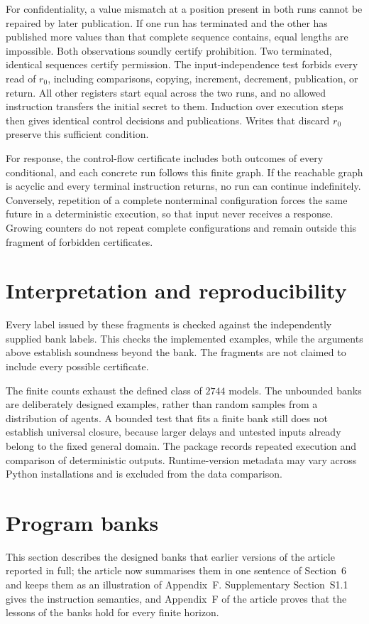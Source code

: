 \documentclass[11pt]{article}
\begin{document}
For confidentiality, a value mismatch at a position present in both runs cannot be repaired by later publication. If one run has terminated and the other has published more values than that complete sequence contains, equal lengths are impossible. Both observations soundly certify prohibition. Two terminated, identical sequences certify permission. The input-independence test forbids every read of $r_0$, including comparisons, copying, increment, decrement, publication, or return. All other registers start equal across the two runs, and no allowed instruction transfers the initial secret to them. Induction over execution steps then gives identical control decisions and publications. Writes that discard $r_0$ preserve this sufficient condition.

For response, the control-flow certificate includes both outcomes of every conditional, and each concrete run follows this finite graph. If the reachable graph is acyclic and every terminal instruction returns, no run can continue indefinitely. Conversely, repetition of a complete nonterminal configuration forces the same future in a deterministic execution, so that input never receives a response. Growing counters do not repeat complete configurations and remain outside this fragment of forbidden certificates.

\section{Interpretation and reproducibility}
Every label issued by these fragments is checked against the independently supplied bank labels. This checks the implemented examples, while the arguments above establish soundness beyond the bank. The fragments are not claimed to include every possible certificate.

The finite counts exhaust the defined class of $2744$ models. The unbounded banks are deliberately designed examples, rather than random samples from a distribution of agents. A bounded test that fits a finite bank still does not establish universal closure, because larger delays and untested inputs already belong to the fixed general domain. The package records repeated execution and comparison of deterministic outputs. Runtime-version metadata may vary across Python installations and is excluded from the data comparison.

\section{Program banks}
This section describes the designed banks that earlier versions of the article reported in full; the article now summarises them in one sentence of Section~6 and keeps them as an illustration of Appendix~F. Supplementary Section~S1.1 gives the instruction semantics, and Appendix~F of the article proves that the lessons of the banks hold for every finite horizon.
\end{document}
